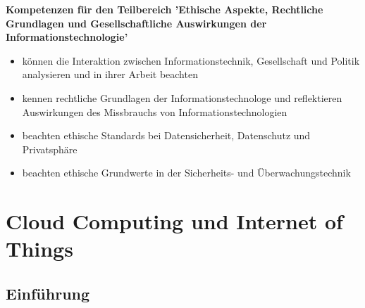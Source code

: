\documentclass[letterpaper, 12pt]{article}
\let\tempsection\section
\renewcommand\section[1]{\vspace{-0.3cm}\tempsection{#1}\vspace{-0.3cm}}
\let\tempsubsection\subsection
\renewcommand\subsection[1]{\vspace{0cm}\tempsubsection{#1}\vspace{0cm}}
\begin{document}
\parindent 0pt
\parskip 6pt



\clearpage
\thispagestyle{empty}
\tableofcontents

\newpage
{}
\pagestyle{fancy}

\textbf{Kompetenzen für den Teilbereich 'Ethische Aspekte, Rechtliche Grundlagen und Gesellschaftliche Auswirkungen der Informationstechnologie'} \newline
\begin{itemize}
	\item können die Interaktion zwischen Informationstechnik, Gesellschaft und Politik analysieren und in ihrer Arbeit beachten
	\item kennen rechtliche Grundlagen der Informationstechnologe und reflektieren Auswirkungen des Missbrauchs von Informationstechnologien
	\item beachten ethische Standards bei Datensicherheit, Datenschutz und Privatsphäre
	\item beachten ethische Grundwerte in der Sicherheits- und Überwachungstechnik
\end{itemize}

\clearpage

\section{Cloud Computing und Internet of Things}

\subsection{Einführung}
\end{document}

